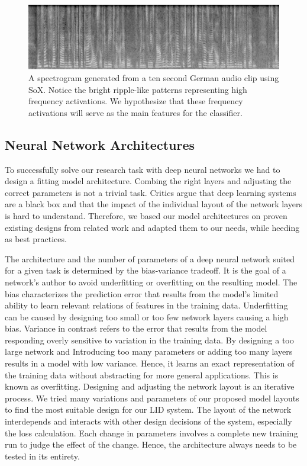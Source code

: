 	
	\begin{figure}[]
  		\centering
    	\includegraphics[width=\textwidth,keepaspectratio]{img/spectrogram.png}
    	\caption{A spectrogram generated from a ten second German audio clip  using SoX. Notice the bright ripple-like patterns representing high frequency activations. We hypothesize that these frequency activations will serve as the main features for the classifier.}
    	\label{fig:spectrogram}
	\end{figure}
	

\subsection{Neural Network Architectures}
\label{sec:cnn_architecture}
To successfully solve our research task with deep neural networks we had to design a fitting model architecture. Combing the right layers and adjusting the correct parameters is not a trivial task. Critics argue that deep learning systems are a black box and that the impact of the individual layout of the network layers is hard to understand. Therefore, we based our model architectures on proven existing designs from related work and adapted them to our needs, while heeding as best practices\cite{mishkin2016systematic, szegedy2016rethinking}.

The architecture and the number of parameters of a deep neural network suited for a given task is determined by the bias-variance tradeoff\cite{geman1992neural}. It is the goal of a network's author to avoid underfitting or overfitting on the resulting model. The bias characterizes the prediction error that results from the model's limited ability to learn relevant relations of features in the training data. Underfitting can be caused by designing too small or too few network layers causing a high bias. Variance in contrast refers to the error that results from the model responding overly sensitive to variation in the training data. By designing a too large network and Introducing too many parameters or adding too many layers results in a model with low variance. Hence, it learns an exact representation of the training data without abstracting for more general applications. This is known as overfitting.
Designing and adjusting the network layout is an iterative process. We tried many variations and parameters of our proposed model layouts to find the most suitable design for our LID system. The layout of the network interdepends and interacts with other design decisions of the system, especially the loss calculation. Each change in parameters involves a complete new training run to judge the effect of the change. Hence, the architecture always needs to be tested in its entirety. 

